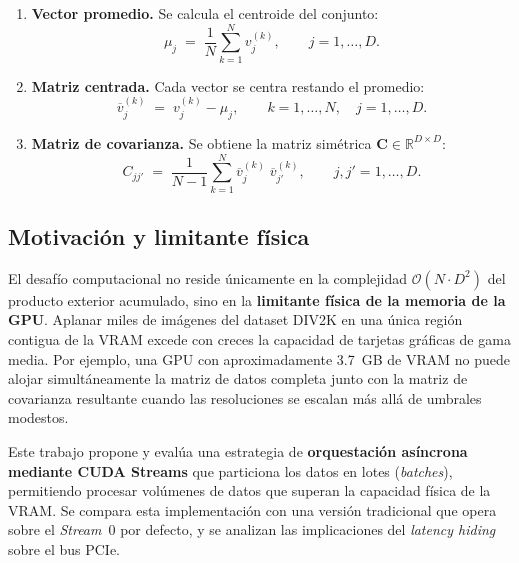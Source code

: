 \documentclass[12pt, a4paper]{article}
\begin{document}
\begin{enumerate}
    \item \textbf{Vector promedio.} Se calcula el centroide del conjunto:
    \begin{equation}
        \mu_j \;=\; \frac{1}{N} \sum_{k=1}^{N} v_j^{(k)},
        \qquad j = 1, \ldots, D.
        \label{eq:media}
    \end{equation}

    \item \textbf{Matriz centrada.} Cada vector se centra restando el promedio:
    \begin{equation}
        \overline{v}_j^{(k)} \;=\; v_j^{(k)} - \mu_j,
        \qquad k = 1, \ldots, N, \quad j = 1, \ldots, D.
        \label{eq:centrado}
    \end{equation}

    \item \textbf{Matriz de covarianza.} Se obtiene la matriz simétrica
    $\mathbf{C} \in \mathbb{R}^{D \times D}$:
    \begin{equation}
        C_{jj'} \;=\; \frac{1}{N-1} \sum_{k=1}^{N}
            \overline{v}_j^{(k)} \;\overline{v}_{j'}^{(k)},
        \qquad j,j' = 1, \ldots, D.
        \label{eq:covarianza}
    \end{equation}
\end{enumerate}

\subsection{Motivación y limitante física}

El desafío computacional no reside únicamente en la complejidad
$\mathcal{O}(N \cdot D^2)$ del producto exterior acumulado, sino en la
\textbf{limitante física de la memoria de la GPU}. Aplanar miles de imágenes
del dataset DIV2K en una única región contigua de la VRAM excede con creces la
capacidad de tarjetas gráficas de gama media. Por ejemplo, una GPU con
aproximadamente 3.7~GB de VRAM no puede alojar simultáneamente la matriz de
datos completa junto con la matriz de covarianza resultante cuando las
resoluciones se escalan más allá de umbrales modestos.

Este trabajo propone y evalúa una estrategia de \textbf{orquestación asíncrona
mediante CUDA Streams} que particiona los datos en lotes (\textit{batches}),
permitiendo procesar volúmenes de datos que superan la capacidad física de la
VRAM. Se compara esta implementación con una versión tradicional que opera
sobre el \textit{Stream}~0 por defecto, y se analizan las implicaciones del
\textit{latency hiding} sobre el bus PCIe.
\end{document}
